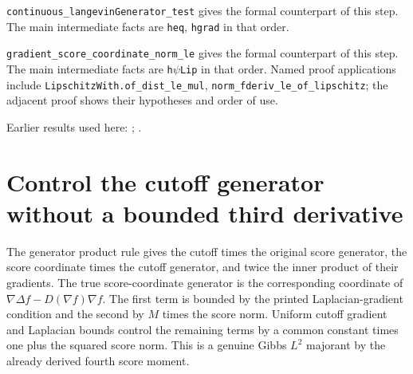 \documentclass[11pt,a4paper]{article}
\begin{document}
\begin{leanbox}
\texttt{continuous\_\allowbreak{}langevin\allowbreak{}Generator\_\allowbreak{}test} gives the formal counterpart of this step. The main intermediate facts are \texttt{heq}, \texttt{hgrad} in that order.




\texttt{gradient\_\allowbreak{}score\_\allowbreak{}coordinate\_\allowbreak{}norm\_\allowbreak{}le} gives the formal counterpart of this step. The main intermediate facts are \texttt{h\ensuremath{\psi}\allowbreak{}Lip} in that order. Named proof applications include \texttt{Lipschitz\allowbreak{}With.\allowbreak{}of\_\allowbreak{}dist\_\allowbreak{}le\_\allowbreak{}mul}, \texttt{norm\_\allowbreak{}fderiv\_\allowbreak{}le\_\allowbreak{}of\_\allowbreak{}lipschitz}; the adjacent proof shows their hypotheses and order of use.
\end{leanbox}


Earlier results used here: \cite[Section~3.46.14]{LangevinLean2026ULASC}; \cite[Section~3.46.2]{LangevinLean2026ULASC}.

\section{\texorpdfstring{Control the cutoff generator without a bounded third derivative}{Control the cutoff generator without a bounded third derivative}}


The generator product rule gives the cutoff times the original score generator, the score coordinate times the cutoff generator, and twice the inner product of their gradients. The true score-coordinate generator is the corresponding coordinate of \(\nabla\Delta f-D(\nabla f)\nabla f\). The first term is bounded by the printed Laplacian-gradient condition and the second by \(M\) times the score norm. Uniform cutoff gradient and Laplacian bounds control the remaining terms by a common constant times one plus the squared score norm. This is a genuine Gibbs \(L^{2}\) majorant by the already derived fourth score moment.
\end{document}
